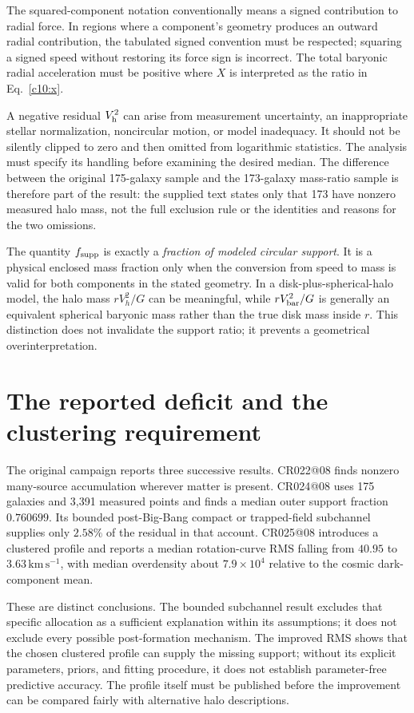 The squared-component notation conventionally means a signed contribution to radial force. In regions where a component's geometry produces an outward radial contribution, the tabulated signed convention must be respected; squaring a signed speed without restoring its force sign is incorrect. The total baryonic radial acceleration must be positive where $X$ is interpreted as the ratio in Eq.~\eqref{c10:x}.

A negative residual $V_{\rm h}^2$ can arise from measurement uncertainty, an inappropriate stellar normalization, noncircular motion, or model inadequacy. It should not be silently clipped to zero and then omitted from logarithmic statistics. The analysis must specify its handling before examining the desired median. The difference between the original 175-galaxy sample and the 173-galaxy mass-ratio sample is therefore part of the result: the supplied text states only that 173 have nonzero measured halo mass, not the full exclusion rule or the identities and reasons for the two omissions.

The quantity $f_{\rm supp}$ is exactly a \emph{fraction of modeled circular support}. It is a physical enclosed mass fraction only when the conversion from speed to mass is valid for both components in the stated geometry. In a disk-plus-spherical-halo model, the halo mass $rV_h^2/G$ can be meaningful, while $rV_{\rm bar}^2/G$ is generally an equivalent spherical baryonic mass rather than the true disk mass inside $r$. This distinction does not invalidate the support ratio; it prevents a geometrical overinterpretation.

\section{The reported deficit and the clustering requirement}

The original campaign reports three successive results. CR022@08 finds nonzero many-source accumulation wherever matter is present. CR024@08 uses 175 galaxies and 3,391 measured points and finds a median outer support fraction $0.760699$. Its bounded post-Big-Bang compact or trapped-field subchannel supplies only $2.58\%$ of the residual in that account. CR025@08 introduces a clustered profile and reports a median rotation-curve RMS falling from $40.95$ to $3.63\,\mathrm{km\,s^{-1}}$, with median overdensity about $7.9\times10^4$ relative to the cosmic dark-component mean.

These are distinct conclusions. The bounded subchannel result excludes that specific allocation as a sufficient explanation within its assumptions; it does not exclude every possible post-formation mechanism. The improved RMS shows that the chosen clustered profile can supply the missing support; without its explicit parameters, priors, and fitting procedure, it does not establish parameter-free predictive accuracy. The profile itself must be published before the improvement can be compared fairly with alternative halo descriptions.


